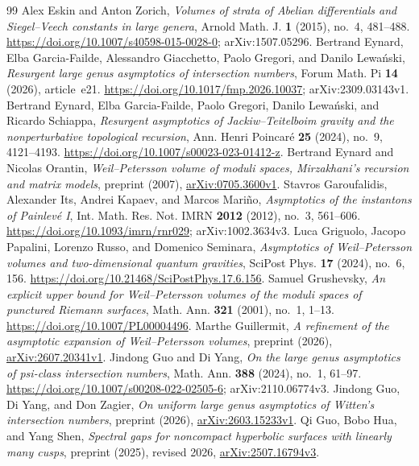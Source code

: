 \begin{thebibliography}{99}
 Alex Eskin and Anton Zorich, \emph{Volumes of strata of Abelian differentials and Siegel--Veech constants in large genera}, Arnold Math. J. \textbf{1} (2015), no.~4, 481--488. \url{https://doi.org/10.1007/s40598-015-0028-0}; arXiv:1507.05296.
 Bertrand Eynard, Elba Garcia-Failde, Alessandro Giacchetto, Paolo Gregori, and Danilo Lewa\'nski, \emph{Resurgent large genus asymptotics of intersection numbers}, Forum Math. Pi \textbf{14} (2026), article~e21. \url{https://doi.org/10.1017/fmp.2026.10037}; arXiv:2309.03143v1.
 Bertrand Eynard, Elba Garcia-Failde, Paolo Gregori, Danilo Lewa\'nski, and Ricardo Schiappa, \emph{Resurgent asymptotics of Jackiw--Teitelboim gravity and the nonperturbative topological recursion}, Ann. Henri Poincar\'e \textbf{25} (2024), no.~9, 4121--4193. \url{https://doi.org/10.1007/s00023-023-01412-z}.
 Bertrand Eynard and Nicolas Orantin, \emph{Weil--Petersson volume of moduli spaces, Mirzakhani's recursion and matrix models}, preprint (2007), \href{https://arxiv.org/abs/0705.3600v1}{arXiv:0705.3600v1}.
 Stavros Garoufalidis, Alexander Its, Andrei Kapaev, and Marcos Mari\~no, \emph{Asymptotics of the instantons of Painlev\'e I}, Int. Math. Res. Not. IMRN \textbf{2012} (2012), no.~3, 561--606. \url{https://doi.org/10.1093/imrn/rnr029}; arXiv:1002.3634v3.
 Luca Griguolo, Jacopo Papalini, Lorenzo Russo, and Domenico Seminara, \emph{Asymptotics of Weil--Petersson volumes and two-dimensional quantum gravities}, SciPost Phys. \textbf{17} (2024), no.~6, 156. \url{https://doi.org/10.21468/SciPostPhys.17.6.156}.
 Samuel Grushevsky, \emph{An explicit upper bound for Weil--Petersson volumes of the moduli spaces of punctured Riemann surfaces}, Math. Ann. \textbf{321} (2001), no.~1, 1--13. \url{https://doi.org/10.1007/PL00004496}.
 Marthe Guillermit, \emph{A refinement of the asymptotic expansion of Weil--Petersson volumes}, preprint (2026), \href{https://arxiv.org/abs/2607.20341v1}{arXiv:2607.20341v1}.
 Jindong Guo and Di Yang, \emph{On the large genus asymptotics of psi-class intersection numbers}, Math. Ann. \textbf{388} (2024), no.~1, 61--97. \url{https://doi.org/10.1007/s00208-022-02505-6}; arXiv:2110.06774v3.
 Jindong Guo, Di Yang, and Don Zagier, \emph{On uniform large genus asymptotics of Witten's intersection numbers}, preprint (2026), \href{https://arxiv.org/abs/2603.15233v1}{arXiv:2603.15233v1}.
 Qi Guo, Bobo Hua, and Yang Shen, \emph{Spectral gaps for noncompact hyperbolic surfaces with linearly many cusps}, preprint (2025), revised 2026, \href{https://arxiv.org/abs/2507.16794v3}{arXiv:2507.16794v3}.

\end{thebibliography}
